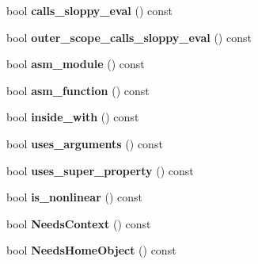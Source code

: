 \begin{DoxyCompactItemize}
\item 
bool {\bfseries calls\+\_\+sloppy\+\_\+eval} () const \hypertarget{classv8_1_1internal_1_1_scope_a46a7497972d9670a6d5d78bafb6c2d82}{}\label{classv8_1_1internal_1_1_scope_a46a7497972d9670a6d5d78bafb6c2d82}

\item 
bool {\bfseries outer\+\_\+scope\+\_\+calls\+\_\+sloppy\+\_\+eval} () const \hypertarget{classv8_1_1internal_1_1_scope_ae475acb57007720d933eda11c8a14f5a}{}\label{classv8_1_1internal_1_1_scope_ae475acb57007720d933eda11c8a14f5a}

\item 
bool {\bfseries asm\+\_\+module} () const \hypertarget{classv8_1_1internal_1_1_scope_ac4c08e5cd06d91e9783c9b3fc388a9f1}{}\label{classv8_1_1internal_1_1_scope_ac4c08e5cd06d91e9783c9b3fc388a9f1}

\item 
bool {\bfseries asm\+\_\+function} () const \hypertarget{classv8_1_1internal_1_1_scope_a01b5f2814d7eda40d64cce9c47a07e77}{}\label{classv8_1_1internal_1_1_scope_a01b5f2814d7eda40d64cce9c47a07e77}

\item 
bool {\bfseries inside\+\_\+with} () const \hypertarget{classv8_1_1internal_1_1_scope_a876d4310ccde172a49d6f7fc872e5f80}{}\label{classv8_1_1internal_1_1_scope_a876d4310ccde172a49d6f7fc872e5f80}

\item 
bool {\bfseries uses\+\_\+arguments} () const \hypertarget{classv8_1_1internal_1_1_scope_a2064c547ad291a42cde8703d74de08bd}{}\label{classv8_1_1internal_1_1_scope_a2064c547ad291a42cde8703d74de08bd}

\item 
bool {\bfseries uses\+\_\+super\+\_\+property} () const \hypertarget{classv8_1_1internal_1_1_scope_acbe6b9328f499fa2b7b2d4fcd59415e6}{}\label{classv8_1_1internal_1_1_scope_acbe6b9328f499fa2b7b2d4fcd59415e6}

\item 
bool {\bfseries is\+\_\+nonlinear} () const \hypertarget{classv8_1_1internal_1_1_scope_a926a8b97a2f59907b1ed10cf1a6eb8b5}{}\label{classv8_1_1internal_1_1_scope_a926a8b97a2f59907b1ed10cf1a6eb8b5}

\item 
bool {\bfseries Needs\+Context} () const \hypertarget{classv8_1_1internal_1_1_scope_a79f3f74931261c9813097d8632843575}{}\label{classv8_1_1internal_1_1_scope_a79f3f74931261c9813097d8632843575}

\item 
bool {\bfseries Needs\+Home\+Object} () const \hypertarget{classv8_1_1internal_1_1_scope_ae7b3dcb3c695b3f6e4b51b58bd5b7204}{}\label{classv8_1_1internal_1_1_scope_ae7b3dcb3c695b3f6e4b51b58bd5b7204}


\end{DoxyCompactItemize}
